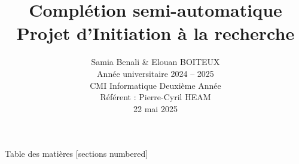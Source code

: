 \documentclass[10pt]{beamer}
\title{\vspace{1cm}Complétion semi-automatique\\Projet d'Initiation à la recherche}
\author{Samia Benali \& Elouan BOITEUX\\[0.3cm]Année universitaire 2024 -- 2025 \\[0.3cm]CMI Informatique Deuxième Année\\[0.3cm] Référent : Pierre-Cyril HEAM \\[0.3cm]22 mai 2025}
\date{}
\begin{document}
\maketitle

\begin{frame}{Table des matières}
	[sections numbered]
	\tableofcontents%
\end{frame}







\end{document}
